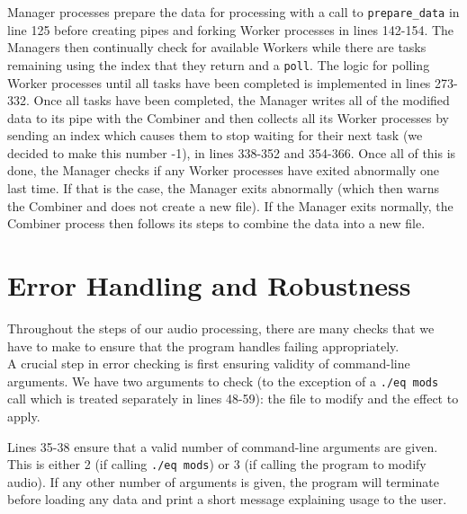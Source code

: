 \documentclass[11pt]{extarticle}
\begin{document}
Manager processes prepare the data for processing with a call to \texttt{prepare\_data} in line 125 before creating pipes and forking Worker processes in lines 142-154. The Managers then continually check for available Workers while there are tasks remaining using the index that they return and a \texttt{poll}. The logic for polling Worker processes until all tasks have been completed is implemented in lines 273-332. Once all tasks have been completed, the Manager writes all of the modified data to its pipe with the Combiner and then collects all its Worker processes by sending an index which causes them to stop waiting for their next task (we decided to make this number -1), in lines 338-352 and 354-366. Once all of this is done, the Manager checks if any Worker processes have exited abnormally one last time. If that is the case, the Manager exits abnormally (which then warns the Combiner and does not create a new file). If the Manager exits normally, the Combiner process then follows its steps to combine the data into a new file.

\section{Error Handling and Robustness}\label{err}

Throughout the steps of our audio processing, there are many checks that we have to make to ensure that the program handles failing appropriately.\\

A crucial step in error checking is first ensuring validity of command-line arguments. We have two arguments to check (to the exception of a \texttt{./eq mods} call which is treated separately in lines 48-59): the file to modify and the effect to apply.

Lines 35-38 ensure that a valid number of command-line arguments are given. This is either 2 (if calling \texttt{./eq mods}) or 3 (if calling the program to modify audio). If any other number of arguments is given, the program will terminate before loading any data and print a short message explaining usage to the user.
\end{document}
